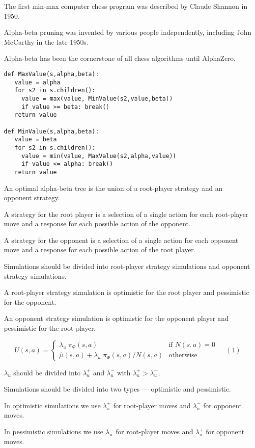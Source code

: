 {

The first min-max computer chess program was described by Claude Shannon in 1950.

\vfill
Alpha-beta pruning was invented by various people independently, including John McCarthy in the late 1950s.

\vfill
Alpha-beta has been the cornerstone of all chess algorithms until AlphaZero.



\begin{verbatim}
def MaxValue(s,alpha,beta):
   value = alpha
   for s2 in s.children():
     value = max(value, MinValue(s2,value,beta))
     if value >= beta: break()
   return value

def MinValue(s,alpha,beta):
   value = beta
   for s2 in s.children():
     value = min(value, MaxValue(s2,alpha,value))
     if value <= alpha: break()
   return value
\end{verbatim}



An optimal alpha-beta tree is the union of a root-player strategy and an opponent strategy.

\vfill
A strategy for the root player is a selection of a single action for each root-player move and a response for each possible action
of the opponent.

\vfill
A strategy for the opponent is a selection of a single action for each opponent move and a response for each possible action
of the root player.


Simulations should be divided into root-player strategy simulations and opponent strategy simulations.

\vfill
A root-player strategy simulation is optimistic for the root player and pessimistic for the opponent.

\vfill
An opponent strategy simulation is optimistic for the opponent player and pessimistic for the root-player.


$$U(s,a) =  \left\{\begin{array}{ll}\lambda_u \; \pi_\Phi(s,a) &\mbox{if $N(s,a) = 0$}
\\ \hat{\mu}(s,a) + \lambda_u\; \pi_\Phi(s,a)/N(s,a) & \mbox{otherwise} \end{array}\right. \;\;\;\;(1)$$

\vfill
$\lambda_u$ should be divided into $\lambda_u^+$ and $\lambda_u^-$ with $\lambda_u^+ > \lambda_u^-$.

\vfill
Simulations should be divided into two types --- optimistic and pessimistic.

\vfill
In optimistic simulations we use $\lambda_u^+$ for root-player moves and $\lambda_u^-$ for opponent moves.

\vfill
In pessimistic simulations we use $\lambda_u^-$ for root-player moves and $\lambda_u^+$ for opponent moves.


}



